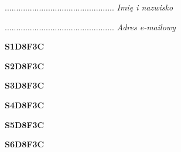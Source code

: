 \begin{turn}{90}\begin{minipage}{\linewidth} \vspace{20mm} ................................................  \textit{Imię i nazwisko}\end{minipage}\end{turn}

\begin{turn}{90}\begin{minipage}{\linewidth} \vspace{20mm} ................................................  \textit{Adres e-mailowy}\end{minipage}\end{turn}

\begin{turn}{90}\huge \begin{minipage}{\linewidth} \vspace{10mm}\textbf{S1D8F3C}\end{minipage}\end{turn}

\begin{turn}{90}\huge \begin{minipage}{\linewidth} \vspace{10mm}\textbf{S2D8F3C}\end{minipage}\end{turn}

\begin{turn}{90}\huge \begin{minipage}{\linewidth} \vspace{10mm}\textbf{S3D8F3C}\end{minipage}\end{turn}

\begin{turn}{90}\huge \begin{minipage}{\linewidth} \vspace{10mm}\textbf{S4D8F3C}\end{minipage}\end{turn}

\begin{turn}{90}\huge \begin{minipage}{\linewidth} \vspace{10mm}\textbf{S5D8F3C}\end{minipage}\end{turn}

\begin{turn}{90}\huge \begin{minipage}{\linewidth} \vspace{10mm}\textbf{S6D8F3C}\end{minipage}\end{turn}

